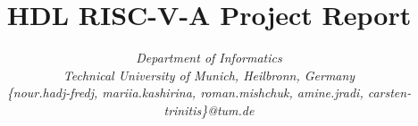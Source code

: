 \documentclass[conference,compsoc,a4paper]{common/IEEEtran}
\begin{document}
\title{HDL RISC-V-A Project Report}

\author{%
	\textit{Department of Informatics}\\
	\textit{Technical University of Munich, Heilbronn, Germany}\\
	\textit{\textup\{nour.hadj-fredj, mariia.kashirina, roman.mishchuk, amine.jradi, carsten-trinitis\textup\}@tum.de}
}

\maketitle


%









 



\nocite{*}
\balance


\end{document}
